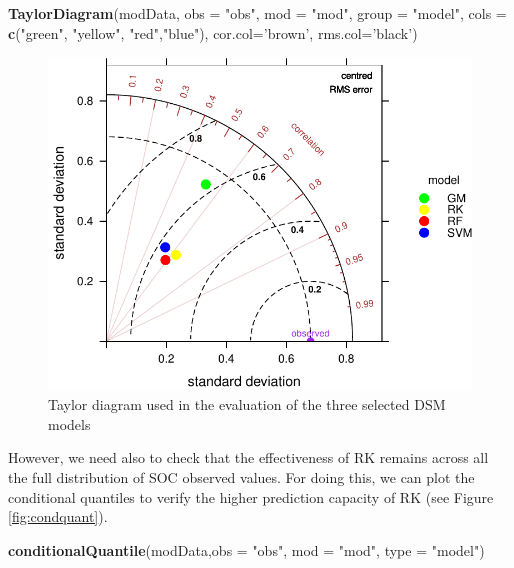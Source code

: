 \documentclass[10pt,b5paper,]{book}
\newenvironment{Shaded}{\begin{snugshade}}{\end{snugshade}}
\newcommand{\DataTypeTok}[1]{\textcolor[rgb]{0.13,0.29,0.53}{#1}}
\newcommand{\KeywordTok}[1]{\textcolor[rgb]{0.13,0.29,0.53}{\textbf{#1}}}
\newcommand{\NormalTok}[1]{#1}
\newcommand{\StringTok}[1]{\textcolor[rgb]{0.31,0.60,0.02}{#1}}
\theoremstyle{definition}
\theoremstyle{definition}
\theoremstyle{definition}
\theoremstyle{remark}
\begin{document}
\begin{Shaded}
\begin{Highlighting}[]
\KeywordTok{TaylorDiagram}\NormalTok{(modData, }\DataTypeTok{obs =} \StringTok{"obs"}\NormalTok{, }\DataTypeTok{mod =} \StringTok{"mod"}\NormalTok{, }\DataTypeTok{group =} \StringTok{"model"}\NormalTok{,}
              \DataTypeTok{cols =} \KeywordTok{c}\NormalTok{(}\StringTok{"green"}\NormalTok{, }\StringTok{"yellow"}\NormalTok{, }\StringTok{"red"}\NormalTok{,}\StringTok{"blue"}\NormalTok{), }
              \DataTypeTok{cor.col=}\StringTok{'brown'}\NormalTok{, }\DataTypeTok{rms.col=}\StringTok{'black'}\NormalTok{)}
\end{Highlighting}
\end{Shaded}

\begin{figure}
\centering
\includegraphics{SOCMapping_files/figure-latex/taylor-1.pdf}
\caption{\label{fig:taylor}Taylor diagram used in the evaluation of the
three selected DSM models}
\end{figure}

However, we need also to check that the effectiveness of RK remains
across all the full distribution of SOC observed values. For doing this,
we can plot the conditional quantiles to verify the higher prediction
capacity of RK (see Figure \ref{fig:condquant}).

\begin{Shaded}
\begin{Highlighting}[]
\KeywordTok{conditionalQuantile}\NormalTok{(modData,}\DataTypeTok{obs =} \StringTok{"obs"}\NormalTok{, }\DataTypeTok{mod =} \StringTok{"mod"}\NormalTok{, }\DataTypeTok{type =} \StringTok{"model"}\NormalTok{)}
\end{Highlighting}
\end{Shaded}
\end{document}

